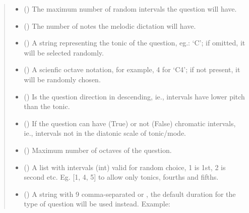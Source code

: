 \documentclass[letterpaper,10pt,english]{sphinxmanual}
\begin{document}
\begin{fulllineitems}
\begin{fulllineitems}
\begin{quote}
\begin{description}
\begin{itemize}
\item {} 
 () \textendash{} The maximum number of random intervals the
question will have.

\item {} 
 () \textendash{} The number of notes the melodic dictation will have.

\item {} 
 () \textendash{} A string representing the tonic of the question,
eg.: ‘C’; if omitted, it will be selected randomly.

\item {} 
 () \textendash{} A scienfic octave notation, for example, 4 for ‘C4’;
if not present, it will be randomly chosen.

\item {} 
 () \textendash{} Is the question direction in descending, ie.,
intervals have lower pitch than the tonic.

\item {} 
 () \textendash{} If the question can have (True) or not (False)
chromatic intervals, ie., intervals not in the diatonic scale
of tonic/mode.

\item {} 
 () \textendash{} Maximum number of octaves of the question.

\item {} 
 () \textendash{} A list with intervals (int) valid for
random choice, 1 is 1st, 2 is second etc. Eg. {[}1, 4, 5{]} to
allow only tonics, fourths and fifths.

\item {} 
 () \textendash{} 
A string with 9 comma-separated  or
, the
default duration for the type of question will be used instead.
Example:


\end{itemize}
\end{description}
\end{quote}
\end{fulllineitems}
\end{fulllineitems}
\end{document}

